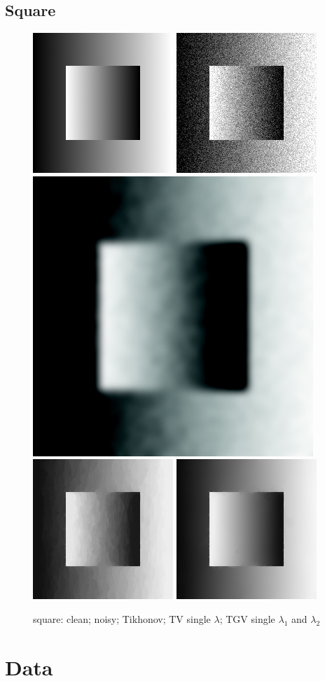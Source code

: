 \documentclass[12pt]{article}
\begin{document}
\subsection{Square}

\begin{figure}[h]
    \centering
    \includegraphics[width=0.19\linewidth]{images/tests/square clean.png}
    \includegraphics[width=0.19\linewidth]{images/tests/square noisy.png}
    \includegraphics[width=0.19\linewidth]{images/tests/square tikhonov.png}
    \includegraphics[width=0.19\linewidth]{images/tests/square TV single lambda.png}
    \includegraphics[width=0.19\linewidth]{images/tests/square TGV single lambdas.png}
    \caption{square: clean; noisy; Tikhonov; TV single $\lambda$; TGV single $\lambda_1$ and $\lambda_2$}
    \label{fig:square_clean}
\end{figure}




\section{Data}
\end{document}
